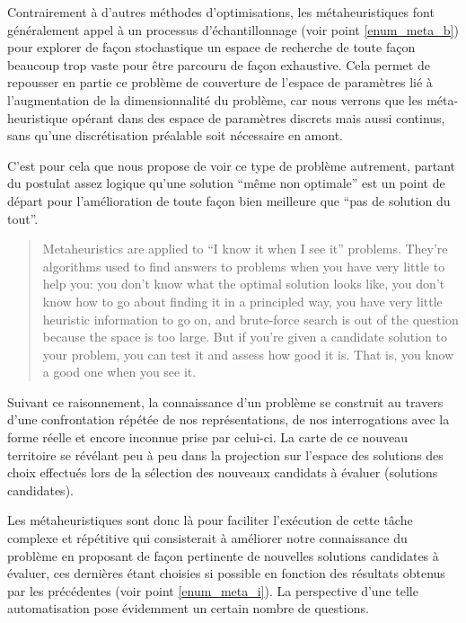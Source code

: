 


Contrairement à d'autres méthodes d'optimisations, les métaheuristiques font généralement appel à un processus d'échantillonnage (voir point \ref{enum_meta_b}) pour explorer de façon stochastique un espace de recherche de toute façon beaucoup trop vaste pour être parcouru de façon exhaustive. Cela permet de repousser en partie ce problème de couverture de l'espace de paramètres lié à l'augmentation de la dimensionnalité du problème, car nous verrons que les méta-heuristique opérant dans des espace de paramètres discrets mais aussi continus, sans qu'une discrétisation préalable soit nécessaire en amont.

C'est pour cela que \textcite[7]{Luke2013} nous propose de voir ce type de problème autrement, partant du postulat assez logique qu'une solution \enquote{même non optimale} est un point de départ pour l'amélioration de toute façon bien meilleure que \enquote{pas de solution du tout}.

\foreignblockquote{english}[{\cite[7]{Luke2013}}]{ Metaheuristics are applied to \enquote{I know it when I see it} problems. They're algorithms used to find answers to problems when you have very little to help you: you don't know what the optimal solution looks like, you don't know how to go about finding it in a principled way, you have very little heuristic information to go on, and brute-force search is out of the question because the space is too large. But if you're given a candidate solution to your problem, you can test it and assess how good it is. That is, you know a good one when you see it.}

Suivant ce raisonnement, la connaissance d'un problème se construit au travers d'une confrontation répétée de nos représentations, de nos interrogations avec la forme réelle et encore inconnue prise par celui-ci. La carte de ce nouveau territoire se révélant peu à peu dans la projection sur l'espace des solutions des choix effectués lors de la sélection des nouveaux candidats à évaluer (solutions candidates).

Les métaheuristiques sont donc là pour faciliter l'exécution de cette tâche complexe et répétitive qui consisterait à améliorer notre connaissance du problème en proposant de façon pertinente de nouvelles solutions candidates à évaluer, ces dernières étant choisies si possible en fonction des résultats obtenus par les précédentes (voir point \ref{enum_meta_i}). La perspective d'une telle automatisation pose évidemment un certain nombre de questions.


